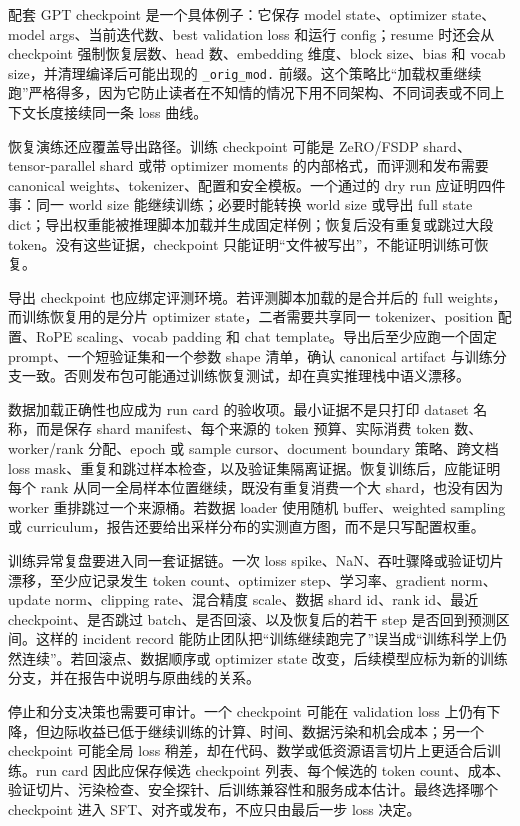 \documentclass[UTF8,zihao=-4,openany]{ctexbook}
\begin{document}
配套 GPT checkpoint 是一个具体例子：它保存 model state、optimizer state、model args、当前迭代数、best validation loss 和运行 config；resume 时还会从 checkpoint 强制恢复层数、head 数、embedding 维度、block size、bias 和 vocab size，并清理编译后可能出现的 \texttt{\_orig\_mod.} 前缀。这个策略比“加载权重继续跑”严格得多，因为它防止读者在不知情的情况下用不同架构、不同词表或不同上下文长度接续同一条 loss 曲线。

恢复演练还应覆盖导出路径。训练 checkpoint 可能是 ZeRO/FSDP shard、tensor-parallel shard 或带 optimizer moments 的内部格式，而评测和发布需要 canonical weights、tokenizer、配置和安全模板。一个通过的 dry run 应证明四件事：同一 world size 能继续训练；必要时能转换 world size 或导出 full state dict；导出权重能被推理脚本加载并生成固定样例；恢复后没有重复或跳过大段 token。没有这些证据，checkpoint 只能证明“文件被写出”，不能证明训练可恢复。

导出 checkpoint 也应绑定评测环境。若评测脚本加载的是合并后的 full weights，而训练恢复用的是分片 optimizer state，二者需要共享同一 tokenizer、position 配置、RoPE scaling、vocab padding 和 chat template。导出后至少应跑一个固定 prompt、一个短验证集和一个参数 shape 清单，确认 canonical artifact 与训练分支一致。否则发布包可能通过训练恢复测试，却在真实推理栈中语义漂移。

数据加载正确性也应成为 run card 的验收项。最小证据不是只打印 dataset 名称，而是保存 shard manifest、每个来源的 token 预算、实际消费 token 数、worker/rank 分配、epoch 或 sample cursor、document boundary 策略、跨文档 loss mask、重复和跳过样本检查，以及验证集隔离证据。恢复训练后，应能证明每个 rank 从同一全局样本位置继续，既没有重复消费一个大 shard，也没有因为 worker 重排跳过一个来源桶。若数据 loader 使用随机 buffer、weighted sampling 或 curriculum，报告还要给出采样分布的实测直方图，而不是只写配置权重。

训练异常复盘要进入同一套证据链。一次 loss spike、NaN、吞吐骤降或验证切片漂移，至少应记录发生 token count、optimizer step、学习率、gradient norm、update norm、clipping rate、混合精度 scale、数据 shard id、rank id、最近 checkpoint、是否跳过 batch、是否回滚、以及恢复后的若干 step 是否回到预测区间。这样的 incident record 能防止团队把“训练继续跑完了”误当成“训练科学上仍然连续”。若回滚点、数据顺序或 optimizer state 改变，后续模型应标为新的训练分支，并在报告中说明与原曲线的关系。

停止和分支决策也需要可审计。一个 checkpoint 可能在 validation loss 上仍有下降，但边际收益已低于继续训练的计算、时间、数据污染和机会成本；另一个 checkpoint 可能全局 loss 稍差，却在代码、数学或低资源语言切片上更适合后训练。run card 因此应保存候选 checkpoint 列表、每个候选的 token count、成本、验证切片、污染检查、安全探针、后训练兼容性和服务成本估计。最终选择哪个 checkpoint 进入 SFT、对齐或发布，不应只由最后一步 loss 决定。
\end{document}
